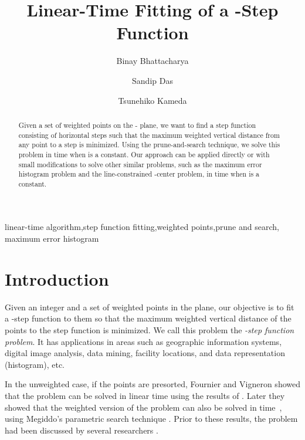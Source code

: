 \documentclass[preprint,10pt]{elsarticle}
\begin{document}
\begin{frontmatter}

\title{Linear-Time Fitting of a -Step Function}\author{Binay Bhattacharya }
\address{School of Computing Science, Simon Fraser University,
Burnaby, Canada}
\author{Sandip Das}
\address{Advanced Computing and Microelectronics Unit, Indian Stat. Inst., Kolkata, India}
\author{Tsunehiko Kameda}
\address{School of Computing Science, Simon Fraser University,
Burnaby, Canada}



\begin{abstract}
Given a set of  weighted points on the - plane,
we want to find a step function consisting of  horizontal steps
such that the maximum weighted vertical distance from any point to a step is minimized.
Using the prune-and-search technique,
we solve this problem in  time when  is a constant.
Our approach can be applied directly or with small modifications
to solve other similar problems,
such as the maximum error histogram problem
and the line-constrained -center problem,
in  time when  is a constant.
\end{abstract}
\begin{keyword}
linear-time algorithm\sep step function fitting\sep weighted points\sep prune and search\sep
maximum error histogram
\end{keyword}
\end{frontmatter}


\section{Introduction}\label{sec:intro}
Given an integer  and a set  of  weighted points in the plane,
our objective is to fit a -step function to them so that the maximum weighted
vertical distance of the points to the step function is minimized.
We call this problem the {\em -step function problem}.
It has applications in areas such as geographic information systems, 
digital image analysis, data mining, facility locations, and
data representation (histogram), etc.

In the unweighted case, if the points are presorted,
Fournier and Vigneron \cite{fournier2011} showed that
the problem can be solved in linear time using the results of 
\cite{frederickson1991a,frederickson1984,gabow1984}.
Later they showed that the weighted version of the problem can also be solved
in  time~\cite{fournier2013},
using Megiddo's parametric search technique \cite{megiddo1983a}.
Prior to these results, the problem had been discussed by several researchers
\cite{chen2009,diazbanez2001,liu2010,lopez2008,wang2002}. 
\end{document}

